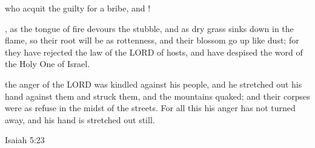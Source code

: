 \documentclass[11pt]{article}
\begin{document}
\begin{biblicaloutline}[Isaiah 5:18-25 (B')]
\begin{versesection}{2em}
         who acquit the guilty for a bribe,
        \poetryline and !
    \end{versesection}
    
    
    \begin{versesection}{2em}
         , as the tongue of fire devours the stubble,
        \poetryline and as dry grass sinks down in the flame,
        so their root will be as rottenness,
        \poetryline and their blossom go up like dust;
        for they have rejected the law of the LORD of hosts,
        \poetryline and have despised the word of the Holy One of Israel.
        
          the anger of the LORD was kindled against his people,
        \poetryline and he stretched out his hand against them and struck them,
        \poetryline and the mountains quaked;
        and their corpses were as refuse
        \poetryline in the midst of the streets.
        For all this his anger has not turned away,
        \poetryline and his hand is stretched out still.
    \end{versesection}

\end{biblicaloutline}

\vspace{2em}

\begin{biblecomparison}{Isaiah 5:23}
\end{biblecomparison}

\vspace{2em}
\end{document}
